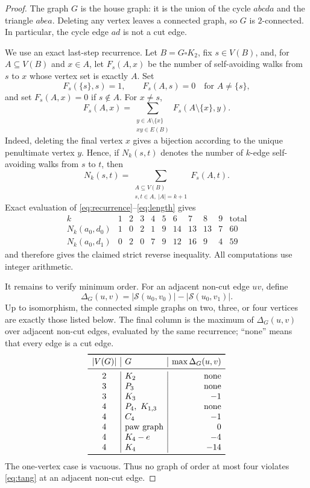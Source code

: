 \documentclass[11pt]{amsart}
\theoremstyle{remark}
\newcommand{\SAW}{\mathcal S}
\begin{document}
\begin{proof}
The graph $G$ is the house graph: it is the union of the cycle
$a b c d a$ and the triangle $a b e a$. Deleting any vertex leaves a
connected graph, so $G$ is $2$-connected. In particular, the cycle
edge $ad$ is not a cut edge.

We use an exact last-step recurrence. Let $B=G\square K_2$, fix
$s\in V(B)$, and, for $A\subseteq V(B)$ and $x\in A$, let $F_s(A,x)$
be the number of self-avoiding walks from $s$ to $x$ whose vertex set
is exactly $A$. Set
\[
  F_s(\{s\},s)=1,
  \qquad
  F_s(A,s)=0\quad\text{for }A\ne\{s\},
\]
and set $F_s(A,x)=0$ if $s\notin A$. For $x\ne s$,
\begin{equation}
  F_s(A,x)=
  \sum_{\substack{y\in A\setminus\{x\}\\xy\in E(B)}}
  F_s(A\setminus\{x\},y).
  \label{eq:recurrence}
\end{equation}
Indeed, deleting the final vertex $x$ gives a bijection according to
the unique penultimate vertex $y$. Hence, if $N_k(s,t)$ denotes the
number of $k$-edge self-avoiding walks from $s$ to $t$, then
\begin{equation}
  N_k(s,t)=
  \sum_{\substack{A\subseteq V(B)\\s,t\in A,\ |A|=k+1}}
  F_s(A,t).
  \label{eq:length}
\end{equation}
Exact evaluation of \eqref{eq:recurrence}--\eqref{eq:length} gives
\[
\begin{array}{c|rrrrrrrrr|r}
 k&1&2&3&4&5&6&7&8&9&\mathrm{total}\\
\hline
 N_k(a_0,d_0)&1&0&2&1&9&14&13&13&7&60\\
 N_k(a_0,d_1)&0&2&0&7&9&12&16&9&4&59
\end{array}
\]
and therefore gives the claimed strict reverse inequality. All
computations use integer arithmetic.

It remains to verify minimum order. For an adjacent non-cut edge
$uv$, define
\[
  \Delta_G(u,v)=|\SAW(u_0,v_0)|-|\SAW(u_0,v_1)|.
\]
Up to isomorphism, the connected simple graphs on two, three, or four
vertices are exactly those listed below. The final column is the
maximum of $\Delta_G(u,v)$ over adjacent non-cut edges, evaluated by
the same recurrence; ``none'' means that every edge is a cut edge.
\[
\begin{array}{c|l|r}
\toprule
|V(G)|&G&\max \Delta_G(u,v)\\
\midrule
2&K_2&\text{none}\\
3&P_3&\text{none}\\
3&K_3&-1\\
4&P_4,\ K_{1,3}&\text{none}\\
4&C_4&-1\\
4&\text{paw graph}&0\\
4&K_4-e&-4\\
4&K_4&-14\\
\bottomrule
\end{array}
\]
The one-vertex case is vacuous. Thus no graph of order at most four
violates \eqref{eq:tang} at an adjacent non-cut edge.
\end{proof}
\end{document}
